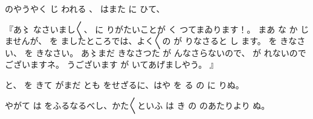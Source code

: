 のやうやく
じ
われる
、
はまた
に
ひて、

『あ〻
なさいまし〳〵、
に
りがたいことが
く
つてまゐります！。
まあ
な
か
じませんが、
を
ましたところでは、よく〳〵の
が
りなさると
し
ます。
を
きなさい、
を
きなさい。
あ〻まだ
きなさつた
が
んなさらないので、
が
れないのでございますネ。
うございます
が
いてあげましやう。
』

と、
を
きて
がまだ
とも
をせざるに、はや
を
る
の
に
りぬ。

やがて
は
をふるなるべし、かた〳〵といふ
は
き
の
のあたりより
ぬ。

